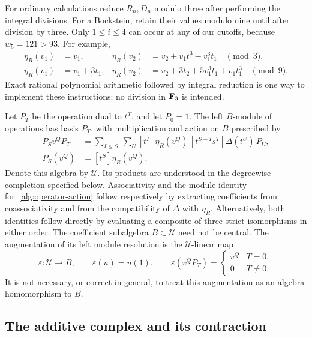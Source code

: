 For ordinary calculations reduce $R_n,D_n$ modulo three after performing
the integral divisions.  For a Bockstein, retain their values modulo nine
until after division by three.  Only $1\leq i\leq4$ can occur at any of
our cutoffs, because $w_5=121>93$.  For example,
\begin{align*}
 \eta_R(v_1)&=v_1,&
 \eta_R(v_2)&=v_2+v_1t_1^3-v_1^3t_1\quad\pmod3,\\
 \eta_R(v_1)&=v_1+3t_1,&
 \eta_R(v_2)&=v_2+3t_2+5v_1^3t_1+v_1t_1^3\quad\pmod9.
\end{align*}
Exact rational polynomial arithmetic followed by integral reduction is
one way to implement these instructions; no division in $\mathbf F_3$ is intended.

Let $P_T$ be the operation dual to $t^T$, and let $P_0=1$.  The left
$B$-module of operations has basis $P_T$, with multiplication and action
on $B$ prescribed by
\begin{align}
 P_Sv^QP_T
 &=\sum_{I\leq S}\ \sum_U
       [t^I]\eta_R(v^Q)\,
       [t^{S-I}s^T]\Delta(t^U)\,P_U,
       \label{alg:operator-product}\\
 P_S(v^Q)&=[t^S]\eta_R(v^Q).
       \label{alg:operator-action}
\end{align}
Denote this algebra by $\mathcal U$.  Its products are understood in the
degreewise completion specified below.  Associativity and the module
identity for~\eqref{alg:operator-action} follow respectively by extracting
coefficients from coassociativity and from the compatibility of
$\Delta$ with $\eta_R$.  Alternatively, both identities follow directly
by evaluating a composite of three strict isomorphisms in either order.
The coefficient subalgebra $B\subset\mathcal U$ need not be central.
The augmentation of its left module resolution is the $\mathcal U$-linear
map
\begin{equation}\label{alg:augmentation}
 \varepsilon:\mathcal U\longrightarrow B,
 \qquad \varepsilon(u)=u(1),\qquad
 \varepsilon(v^QP_T)=
 \begin{cases}v^Q&T=0,\\0&T\ne0.\end{cases}
\end{equation}
It is not necessary, or correct in general, to treat this augmentation
as an algebra homomorphism to $B$.

\subsection{The additive complex and its contraction}

